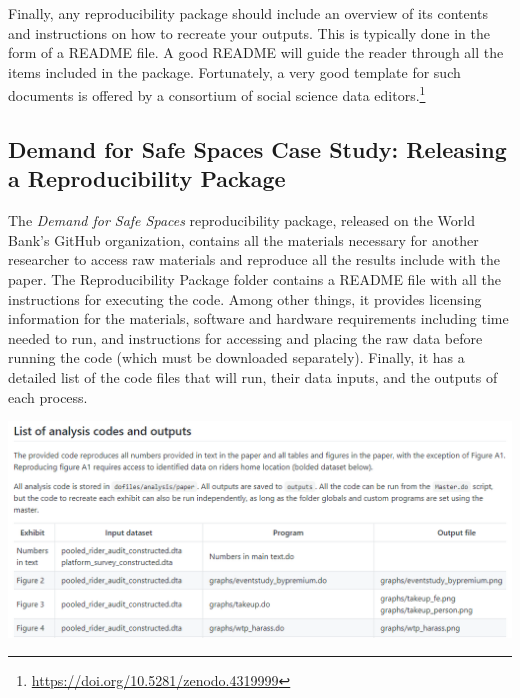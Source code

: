 \documentclass[
]{book}
\begin{document}
Finally, any reproducibility package should include an overview of its contents
and instructions on how to recreate your outputs.
This is typically done in the form of a README file.
A good README will guide the reader through all the items included in the package.
Fortunately, a very good template for such documents is offered by
a consortium of social science data editors.\footnote{\url{https://doi.org/10.5281/zenodo.4319999}}

\begin{ex}
\hypertarget{demand-for-safe-spaces-case-study-releasing-a-reproducibility-package}{%
\subsection{Demand for Safe Spaces Case Study: Releasing a Reproducibility Package}\label{demand-for-safe-spaces-case-study-releasing-a-reproducibility-package}}

The \emph{Demand for Safe Spaces} reproducibility package, released on the World Bank's GitHub organization, contains all the materials necessary for another researcher to access raw materials and reproduce all the results include with the paper. The Reproducibility Package folder contains a README file with all the instructions for executing the code. Among other things, it provides licensing information for the materials, software and hardware requirements including time needed to run, and instructions for accessing and placing the raw data before running the code (which must be downloaded separately). Finally, it has a detailed list of the code files that will run, their data inputs, and the outputs of each process.

\includegraphics{examples/README.png}


\end{ex}
\end{document}
